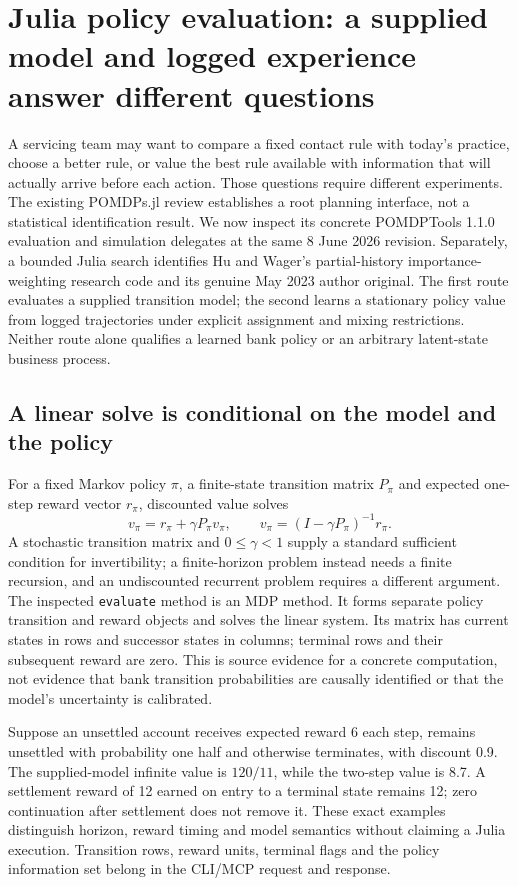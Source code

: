 \section{Julia policy evaluation: a supplied model and logged experience answer different questions}
\label{sec:exec24-policies-other}

A servicing team may want to compare a fixed contact rule with today's practice,
choose a better rule, or value the best rule available with information that
will actually arrive before each action. Those questions require different
experiments. The existing POMDPs.jl review establishes a root planning interface,
not a statistical identification result. We now inspect its concrete
POMDPTools 1.1.0 evaluation and simulation delegates at the same 8 June 2026
revision. Separately, a bounded Julia search identifies Hu and Wager's
partial-history importance-weighting research code and its genuine May 2023
author original. The first route evaluates a supplied transition model; the
second learns a stationary policy value from logged trajectories under explicit
assignment and mixing restrictions. Neither route alone qualifies a learned
bank policy or an arbitrary latent-state business process.
\citep{exec23_pomdpsjl_sources,exec24_policyother_tools,exec24_policyother_ope,exec24_policyother_original}

\subsection{A linear solve is conditional on the model and the policy}
For a fixed Markov policy $\pi$, a finite-state transition matrix $P_\pi$ and
expected one-step reward vector $r_\pi$, discounted value solves
\[
 v_\pi=r_\pi+\gamma P_\pi v_\pi,
 \qquad v_\pi=(I-\gamma P_\pi)^{-1}r_\pi.
\]
A stochastic transition matrix and $0\leq\gamma<1$ supply a standard sufficient
condition for invertibility; a finite-horizon problem instead needs a finite
recursion, and an undiscounted recurrent problem requires a different
argument. The inspected \texttt{evaluate} method is an MDP method. It forms
separate policy transition and reward objects and solves the linear system.
Its matrix has current states in rows and successor states in columns;
terminal rows and their subsequent reward are zero. This is source evidence
for a concrete computation, not evidence that bank transition probabilities
are causally identified or that the model's uncertainty is calibrated.
\citep{exec24_policyother_tools}

Suppose an unsettled account receives expected reward 6 each step, remains
unsettled with probability one half and otherwise terminates, with discount
0.9. The supplied-model infinite value is $120/11$, while the two-step value
is 8.7. A settlement reward of 12 earned on entry to a terminal state remains
12; zero continuation after settlement does not remove it. These exact
examples distinguish horizon, reward timing and model semantics without
claiming a Julia execution. Transition rows, reward units, terminal flags and
the policy information set belong in the CLI/MCP request and response.
\citep{exec24_policyother_contract}

